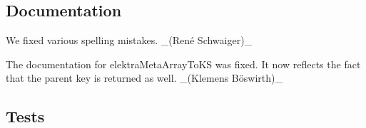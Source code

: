 \subsection*{Documentation}


\begin{DoxyItemize}
\item We fixed various spelling mistakes. \+\_\+(René Schwaiger)\+\_\+
\item The documentation for {\ttfamily elektra\+Meta\+Array\+To\+KS} was fixed. It now reflects the fact that the parent key is returned as well. \+\_\+(Klemens Böswirth)\+\_\+
\end{DoxyItemize}

\subsection*{Tests}


